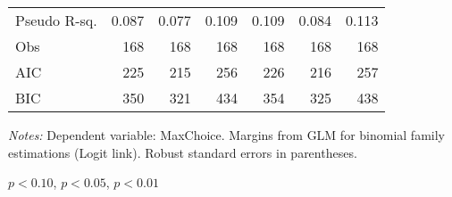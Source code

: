 \begin{table}[htbp]
\begin{adjustbox}{width=1\textwidth}
\begin{threeparttable}
\begin{tabular}{l*{6}{D{.}{.}{-1}}}
\midrule
Pseudo R-sq.               &  0.087  &  0.077    &     0.109     &     0.109    & 0.084 & 0.113 \\
Obs                 &                 168   &                 168   &                 168   &                 168   &                 168   &                 168   \\
AIC                 &                 225   &                 215   &                 256   &                 226   &                 216   &                 257   \\
BIC                 &                 350   &                 321   &                 434   &                 354   &                 325   &                 438   \\
\bottomrule
\end{tabular}
\begin{tablenotes}
\footnotesize
\item \textit{Notes:} Dependent variable: MaxChoice. Margins from GLM for binomial family estimations (Logit link). Robust standard errors in parentheses. \\
\item \sym{*} \(p<0.10\), \sym{**} \(p<0.05\), \sym{***} \(p<0.01\)
\end{tablenotes}
\end{threeparttable}
\end{adjustbox}
\label{tab:maxchoice_totaltr}
\end{table}